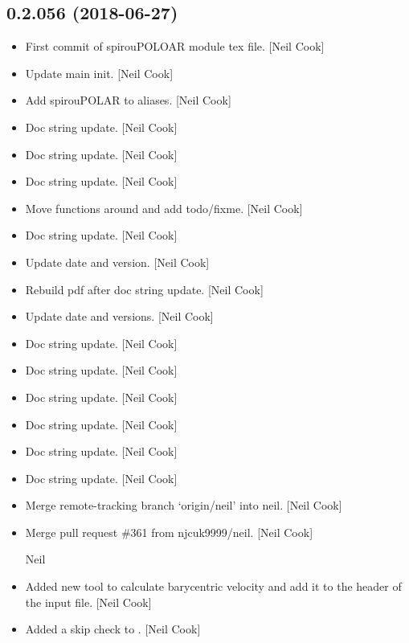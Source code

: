 \documentclass[a4paper,10pt,english]{report}
\begin{document}
\subsection{0.2.056 (2018-06-27)}
\label{\detokenize{misc/changelog:id408}}\begin{itemize}
\item {} 
First commit of spirouPOLOAR module tex file. {[}Neil Cook{]}

\item {} 
Update main init. {[}Neil Cook{]}

\item {} 
Add spirouPOLAR to aliases. {[}Neil Cook{]}

\item {} 
Doc string update. {[}Neil Cook{]}

\item {} 
Doc string update. {[}Neil Cook{]}

\item {} 
Doc string update. {[}Neil Cook{]}

\item {} 
Move functions around and add todo/fixme. {[}Neil Cook{]}

\item {} 
Doc string update. {[}Neil Cook{]}

\item {} 
Update date and version. {[}Neil Cook{]}

\item {} 
Rebuild pdf after doc string update. {[}Neil Cook{]}

\item {} 
Update date and versions. {[}Neil Cook{]}

\item {} 
Doc string update. {[}Neil Cook{]}

\item {} 
Doc string update. {[}Neil Cook{]}

\item {} 
Doc string update. {[}Neil Cook{]}

\item {} 
Doc string update. {[}Neil Cook{]}

\item {} 
Doc string update. {[}Neil Cook{]}

\item {} 
Doc string update. {[}Neil Cook{]}

\item {} 
Merge remote-tracking branch ‘origin/neil’ into neil. {[}Neil Cook{]}

\item {} 
Merge pull request \#361 from njcuk9999/neil. {[}Neil Cook{]}

Neil

\item {} 
Added new tool to calculate barycentric velocity and add it to the
header of the input file. {[}Neil Cook{]}

\item {} 
Added a skip check to . {[}Neil Cook{]}

\end{itemize}
\end{document}
